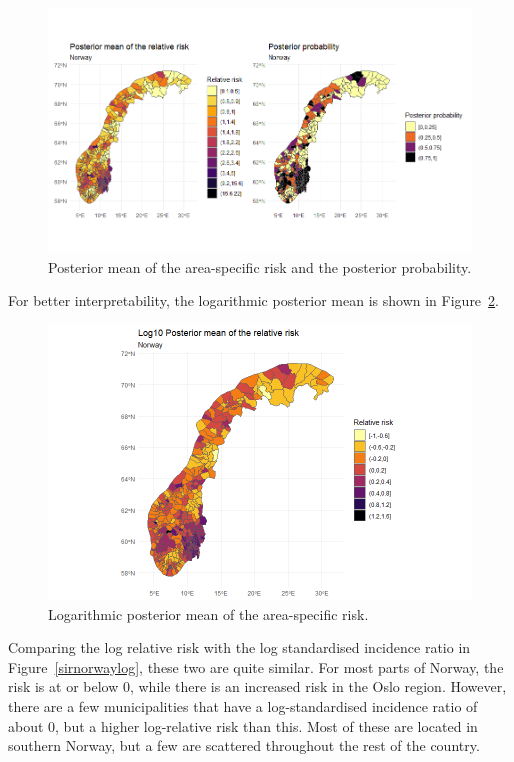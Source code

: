 \begin{figure}[H]
    \centering
    \includegraphics[width = \textwidth]{posterior_norway.png}
    \caption{Posterior mean of the area-specific risk and the posterior probability.}
    \label{posteriorNorway}
\end{figure}
%     
For better interpretability, the logarithmic posterior mean is shown in Figure~\ref{posteriorNorwayLog}.
\begin{figure}[H]
    \centering
    \includegraphics[width = \textwidth]{posterior_norway_log.png}
    \caption{Logarithmic posterior mean of the area-specific risk.}
    \label{posteriorNorwayLog}
\end{figure}
%     
Comparing the log relative risk with the log standardised incidence ratio in Figure~\ref{sirnorwaylog}, these two are quite similar. For most parts of Norway, the risk is at or below 0, while there is an increased risk in the Oslo region. However, there are a few municipalities that have a log-standardised incidence ratio of about 0, but a higher log-relative risk than this. Most of these are located in southern Norway, but a few are scattered throughout the rest of the country.
